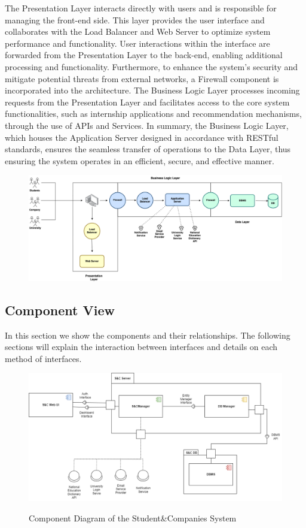 \documentclass[a4paper,12pt]{article}
\begin{document}
 The Presentation Layer interacts directly with users and is responsible for managing the front-end side. This layer provides the user interface and collaborates with the Load Balancer and Web Server to optimize system performance and functionality. User interactions within the interface are forwarded from the Presentation Layer to the back-end, enabling additional processing and functionality. Furthermore, to enhance the system’s security and mitigate potential threats from external networks, a Firewall component is incorporated into the architecture. The Business Logic Layer processes incoming requests from the Presentation Layer and facilitates access to the core system functionalities, such as internship applications and recommendation mechanisms, through the use of APIs and Services. In summary, the Business Logic Layer, which houses the Application Server designed in accordance with RESTful standards, ensures the seamless transfer of operations to the Data Layer, thus ensuring the system operates in an efficient, secure, and effective manner.
\begin{figure}[H]
\centering
\includegraphics[scale = 0.40]{DD_figures/SingleDiagrams/overviewDiagram.png}
\end{figure}

\newpage
\subsection{Component View}
In this section we show the components and their relationships. The following
sections will explain the interaction between interfaces and details on each method of interfaces.
\begin{figure}[H]
\centering
\includegraphics[scale = 0.50]{DD_figures/GeneralComponentDiagram.drawio.png}\\
\caption{Component Diagram of the Student\&Companies System}
\end{figure}
\end{document}
